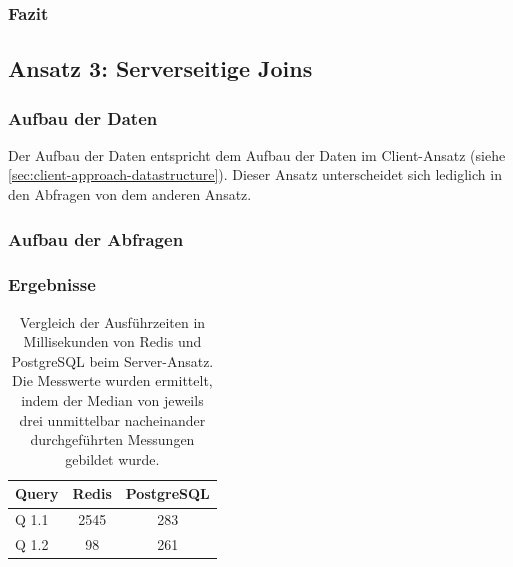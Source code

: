 
\subsubsection{Fazit}

\subsection{Ansatz 3: Serverseitige Joins}
\subsubsection{Aufbau der Daten}
Der Aufbau der Daten entspricht dem Aufbau der Daten im Client-Ansatz (siehe \cref{sec:client-approach-datastructure}). Dieser Ansatz unterscheidet sich lediglich in den Abfragen von dem anderen Ansatz.
\subsubsection{Aufbau der Abfragen}
\subsubsection{Ergebnisse}

\begin{table}[h]
\centering
\begin{tabular}{lcc}
\hline
Query & Redis & PostgreSQL \\ \hline
Q 1.1 & 2545  & 283       \\
Q 1.2 & 98    & 261       \\ \hline
\end{tabular}
\caption{Vergleich der Ausführzeiten in Millisekunden von Redis und PostgreSQL beim Server-Ansatz.\\
 Die Messwerte wurden ermittelt, indem der Median von jeweils drei unmittelbar nacheinander durchgeführten Messungen gebildet wurde.}
\label{tab:results-server}
\end{table}

